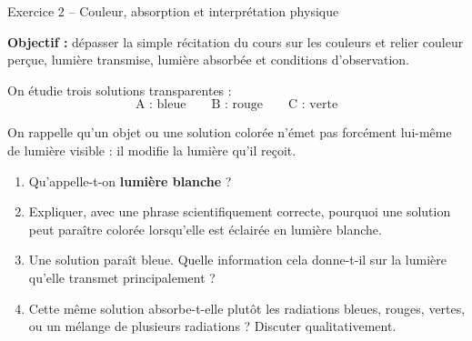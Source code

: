 \documentclass[11pt,a4paper]{article}
\begin{document}
\begin{exobox}{Exercice 2 -- Couleur, absorption et interprétation physique}
\begin{objectifbox}
\textbf{Objectif :} dépasser la simple récitation du cours sur les couleurs et relier couleur perçue, lumière transmise, lumière absorbée et conditions d’observation.
\end{objectifbox}

On étudie trois solutions transparentes :
\[
\text{A : bleue} \qquad \text{B : rouge} \qquad \text{C : verte}
\]

On rappelle qu’un objet ou une solution colorée n’émet pas forcément lui-même de lumière visible : il modifie la lumière qu’il reçoit.

\begin{center}
\end{center}

\begin{enumerate}[label=\textbf{\arabic*.}]
    \item Qu’appelle-t-on \textbf{lumière blanche} ?

    \item Expliquer, avec une phrase scientifiquement correcte, pourquoi une solution peut paraître colorée lorsqu’elle est éclairée en lumière blanche.

    \item Une solution paraît bleue. Quelle information cela donne-t-il sur la lumière qu’elle transmet principalement ?

    \item Cette même solution absorbe-t-elle plutôt les radiations bleues, rouges, vertes, ou un mélange de plusieurs radiations ? Discuter qualitativement.


\end{enumerate}
\end{exobox}
\end{document}
